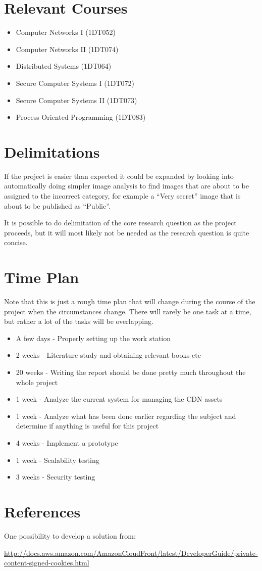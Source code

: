 \documentclass[a4paper,12pt]{article}
\begin{document}
\section{Relevant Courses}
\begin{itemize}
  \item Computer Networks I (1DT052)
  \item Computer Networks II (1DT074)
  \item Distributed Systems (1DT064)
  \item Secure Computer Systems I (1DT072)
  \item Secure Computer Systems II (1DT073)
  \item Process Oriented Programming (1DT083)
\end{itemize}

\section{Delimitations}
If the project is easier than expected it could be expanded by looking into 
automatically doing simpler image analysis to find images that are about to 
be assigned to the incorrect category, for example a ``Very secret'' image 
that is about to be published as ``Public''.

It is possible to do delimitation of the core research question as the project 
proceeds, but it will most likely not be needed as the research question is 
quite concise.

\section{Time Plan}
Note that this is just a rough time plan that will change during the course of 
the project when the circumstances change.
There will rarely be one task at a time, but rather a lot of the tasks will be 
overlapping.
\begin{itemize}
  \item A few days - Properly setting up the work station
  \item 2 weeks - Literature study and obtaining relevant books etc
  \item 20 weeks - Writing the report should be done pretty much 
  throughout the whole project
  \item 1 week - Analyze the current system for managing the CDN assets
  \item 1 week - Analyze what has been done earlier regarding the 
  subject and determine if anything is useful for this project
  \item 4 weeks - Implement a prototype
  \item 1 week - Scalability testing
  \item 3 weeks - Security testing
\end{itemize}

\section{References}
One possibility to develop a solution from:

\url{http://docs.aws.amazon.com/AmazonCloudFront/latest/DeveloperGuide/private-content-signed-cookies.html}
\end{document}
